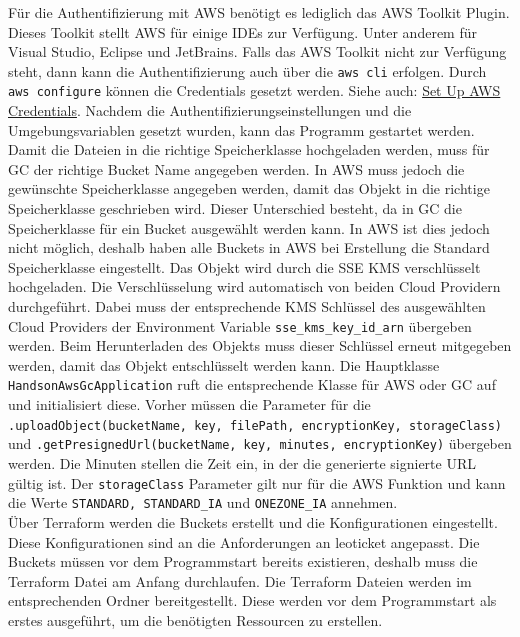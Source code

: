 Für die Authentifizierung mit AWS benötigt es lediglich das AWS Toolkit Plugin. Dieses Toolkit stellt AWS für einige IDEs zur Verfügung. Unter anderem für Visual Studio, Eclipse und JetBrains. Falls das AWS Toolkit nicht zur Verfügung steht, dann kann die Authentifizierung auch über die \verb|aws cli| erfolgen. Durch \verb|aws configure| können die Credentials gesetzt werden. Siehe auch: \href{https://docs.aws.amazon.com/sdk-for-java/latest/developer-guide/setup-basics.html}{Set Up AWS Credentials}. Nachdem die Authentifizierungseinstellungen und die Umgebungsvariablen gesetzt wurden, kann das Programm gestartet werden. Damit die Dateien in die richtige Speicherklasse hochgeladen werden, muss für GC der richtige Bucket Name angegeben werden. In AWS muss jedoch die gewünschte Speicherklasse angegeben werden, damit das Objekt in die richtige Speicherklasse geschrieben wird. Dieser Unterschied besteht, da in GC die Speicherklasse für ein Bucket ausgewählt werden kann. In AWS ist dies jedoch nicht möglich, deshalb haben alle Buckets in AWS bei Erstellung die Standard Speicherklasse eingestellt. Das Objekt wird durch die SSE KMS verschlüsselt hochgeladen. Die Verschlüsselung wird automatisch von beiden Cloud Providern durchgeführt. Dabei muss der entsprechende KMS Schlüssel des ausgewählten Cloud Providers der Environment Variable \verb|sse_kms_key_id_arn| übergeben werden. Beim Herunterladen des Objekts muss dieser Schlüssel erneut mitgegeben werden, damit das Objekt entschlüsselt werden kann. Die Hauptklasse \verb|HandsonAwsGcApplication| ruft die entsprechende Klasse für AWS oder GC auf und initialisiert diese. Vorher müssen die Parameter für die \verb|.uploadObject(bucketName, key, filePath, encryptionKey, storageClass)| und \verb|.getPresignedUrl(bucketName, key, minutes, encryptionKey)| übergeben werden. Die Minuten stellen die Zeit ein, in der die generierte signierte URL gültig ist. Der \verb|storageClass| Parameter gilt nur für die AWS Funktion und kann die Werte \verb|STANDARD, STANDARD_IA| und \verb|ONEZONE_IA| annehmen.\\

Über Terraform werden die Buckets erstellt und die Konfigurationen eingestellt. Diese Konfigurationen sind an die Anforderungen an leoticket angepasst. Die Buckets müssen vor dem Programmstart bereits existieren, deshalb muss die Terraform Datei am Anfang durchlaufen. Die Terraform Dateien werden im entsprechenden Ordner bereitgestellt. Diese werden vor dem Programmstart als erstes ausgeführt, um die benötigten Ressourcen zu erstellen.\\

